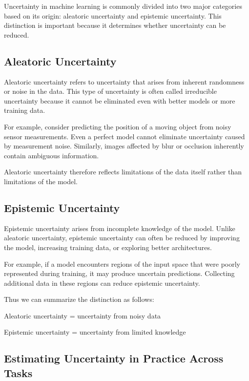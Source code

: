 \documentclass{article}
\begin{document}
Uncertainty in machine learning is commonly divided into two major categories based on its origin: aleatoric uncertainty and epistemic uncertainty. This distinction is important because it determines whether uncertainty can be reduced.

\subsection{Aleatoric Uncertainty}

Aleatoric uncertainty refers to uncertainty that arises from inherent randomness or noise in the data. This type of uncertainty is often called irreducible uncertainty because it cannot be eliminated even with better models or more training data.

For example, consider predicting the position of a moving object from noisy sensor measurements. Even a perfect model cannot eliminate uncertainty caused by measurement noise. Similarly, images affected by blur or occlusion inherently contain ambiguous information.

Aleatoric uncertainty therefore reflects limitations of the data itself rather than limitations of the model.

\subsection{Epistemic Uncertainty}

Epistemic uncertainty arises from incomplete knowledge of the model. Unlike aleatoric uncertainty, epistemic uncertainty can often be reduced by improving the model, increasing training data, or exploring better architectures.

For example, if a model encounters regions of the input space that were poorly represented during training, it may produce uncertain predictions. Collecting additional data in these regions can reduce epistemic uncertainty.

Thus we can summarize the distinction as follows:

\begin{center}
Aleatoric uncertainty = uncertainty from noisy data

Epistemic uncertainty = uncertainty from limited knowledge
\end{center}


\subsection{Estimating Uncertainty in Practice Across Tasks}
\end{document}
